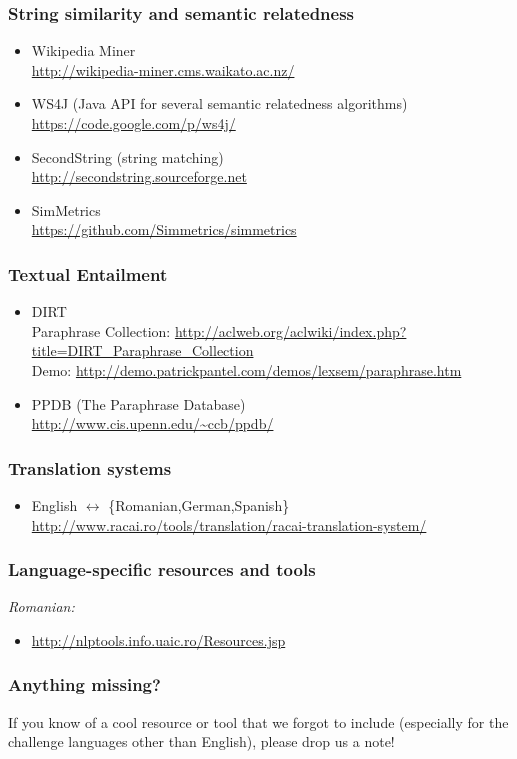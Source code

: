 \subsubsection*{String similarity and semantic relatedness}

\begin{itemize}
\item Wikipedia Miner \\
      \url{http://wikipedia-miner.cms.waikato.ac.nz/}
\item WS4J (Java API for several semantic relatedness algorithms) \\
      \url{https://code.google.com/p/ws4j/}
\item SecondString (string matching) \\
      \url{http://secondstring.sourceforge.net}
\item SimMetrics \\
      \url{https://github.com/Simmetrics/simmetrics}
\end{itemize}

\subsubsection*{Textual Entailment}

\begin{itemize}
\item DIRT \\
      Paraphrase Collection: \url{http://aclweb.org/aclwiki/index.php?title=DIRT_Paraphrase_Collection} \\
      Demo: \url{http://demo.patrickpantel.com/demos/lexsem/paraphrase.htm}
\item PPDB (The Paraphrase Database) \\
      \url{http://www.cis.upenn.edu/~ccb/ppdb/}
\end{itemize}

\subsubsection*{Translation systems}

\begin{itemize}
\item English $\leftrightarrow$ \{Romanian,German,Spanish\} \\
\url{http://www.racai.ro/tools/translation/racai-translation-system/}
\end{itemize}

\subsubsection*{Language-specific resources and tools}

\emph{Romanian:}
\begin{itemize}
\item \url{http://nlptools.info.uaic.ro/Resources.jsp}
\end{itemize}


\subsubsection*{Anything missing?}

If you know of a cool resource or tool that we forgot to include (especially for the challenge languages other than English),
please drop us a note!

